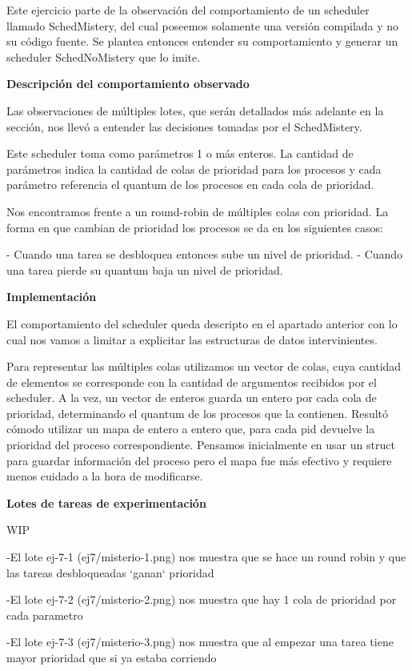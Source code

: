 Este ejercicio parte de la observación del comportamiento de un scheduler llamado SchedMistery, del cual poseemos solamente una versión compilada y no su código fuente. Se plantea entonces entender su comportamiento y generar un scheduler SchedNoMistery que lo imite.

\bigskip

\textbf{Descripción del comportamiento observado}

Las observaciones de múltiples lotes, que serán detallados más adelante en la sección, nos llevó a entender las decisiones tomadas por el SchedMistery.

Este scheduler toma como parámetros 1 o más enteros. La cantidad de parámetros indica la cantidad de colas de prioridad para los procesos y cada parámetro
referencia el quantum de los procesos en cada cola de prioridad.

Nos encontramos frente a un round-robin de múltiples colas con prioridad. La forma en que cambian de prioridad los procesos se da en los siguientes casos:

- Cuando una tarea se desbloquea entonces sube un nivel de prioridad.
- Cuando una tarea pierde su quantum baja un nivel de prioridad.


\textbf{Implementación}

El comportamiento del scheduler queda descripto en el apartado anterior con lo cual nos vamos a limitar a explicitar las estructuras de datos intervinientes.

Para representar las múltiples colas utilizamos un vector de colas, cuya cantidad de elementos se corresponde con la cantidad de argumentos recibidos por el scheduler.
A la vez, un vector de enteros guarda un entero por cada cola de prioridad, determinando el quantum de los procesos que la contienen.
Resultó cómodo utilizar un mapa de entero a entero que, para cada pid devuelve la prioridad del proceso correspondiente.
Pensamos inicialmente en usar un struct para guardar información del proceso pero el mapa fue más efectivo y requiere menos cuidado a la hora de modificarse.

\bigskip

\textbf{Lotes de tareas de experimentación}

WIP

-El lote ej-7-1 (ej7/misterio-1.png) nos muestra que se hace un round robin y que las tareas desbloqueadas `ganan` prioridad

-El lote ej-7-2 (ej7/misterio-2.png) nos muestra que hay 1 cola de prioridad por cada parametro

-El lote ej-7-3 (ej7/misterio-3.png) nos muestra que al empezar una tarea tiene mayor prioridad que si ya estaba corriendo
